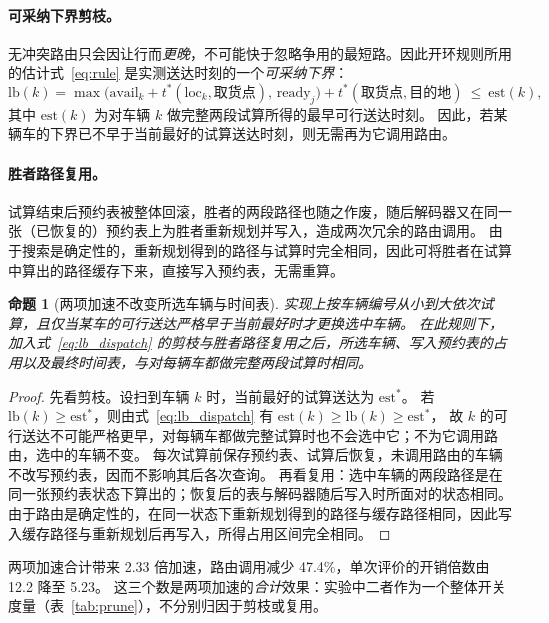 \documentclass[manuscript,screen,review]{acmart}
\newtheorem{prop}{命题}
\newcommand{\SpeedupProbe}{2.33}
\newcommand{\RouteCallCut}{47.4\%}
\newcommand{\CostMultBefore}{12.2}
\newcommand{\CostMultAfter}{5.23}
\begin{document}
\paragraph{可采纳下界剪枝。}
无冲突路由只会因让行而\emph{更晚}，不可能快于忽略争用的最短路。因此开环规则所用的估计式~\eqref{eq:rule} 是实测送达时刻的一个\emph{可采纳下界}：
\begin{equation}
\label{eq:lb_dispatch}
\mathrm{lb}(k)=\max\bigl(\mathrm{avail}_k+t^{*}(\mathrm{loc}_k,\text{取货点}),\,
\mathrm{ready}_j\bigr)+t^{*}(\text{取货点},\text{目的地})\ \le\ \mathrm{est}(k),
\end{equation}
其中 $\mathrm{est}(k)$ 为对车辆 $k$ 做完整两段试算所得的最早可行送达时刻。
因此，若某辆车的下界已不早于当前最好的试算送达时刻，则无需再为它调用路由。

\paragraph{胜者路径复用。}
试算结束后预约表被整体回滚，胜者的两段路径也随之作废，随后解码器又在同一张（已恢复的）预约表上为胜者重新规划并写入，造成两次冗余的路由调用。
由于搜索是确定性的，重新规划得到的路径与试算时完全相同，因此可将胜者在试算中算出的路径缓存下来，直接写入预约表，无需重算。

\begin{prop}[两项加速不改变所选车辆与时间表]
  \label{prop:speedup_equiv}
  实现上按车辆编号从小到大依次试算，且仅当某车的可行送达严格早于当前最好时才更换选中车辆。
  在此规则下，加入式~\eqref{eq:lb_dispatch} 的剪枝与胜者路径复用之后，所选车辆、写入预约表的占用以及最终时间表，与对每辆车都做完整两段试算时相同。
\end{prop}

\begin{proof}
  先看剪枝。设扫到车辆 $k$ 时，当前最好的试算送达为 $\mathrm{est}^{\ast}$。
  若 $\mathrm{lb}(k)\ge \mathrm{est}^{\ast}$，则由式~\eqref{eq:lb_dispatch} 有
  $\mathrm{est}(k)\ge\mathrm{lb}(k)\ge\mathrm{est}^{\ast}$，
  故 $k$ 的可行送达不可能严格更早，对每辆车都做完整试算时也不会选中它；不为它调用路由，选中的车辆不变。
  每次试算前保存预约表、试算后恢复，未调用路由的车辆不改写预约表，因而不影响其后各次查询。
  再看复用：选中车辆的两段路径是在同一张预约表状态下算出的；恢复后的表与解码器随后写入时所面对的状态相同。
  由于路由是确定性的，在同一状态下重新规划得到的路径与缓存路径相同，因此写入缓存路径与重新规划后再写入，所得占用区间完全相同。
\end{proof}

两项加速合计带来 \SpeedupProbe{} 倍加速，路由调用减少 \RouteCallCut{}，单次评价的开销倍数由 \CostMultBefore{} 降至 \CostMultAfter{}。
这三个数是两项加速的\emph{合计}效果：实验中二者作为一个整体开关度量（表~\ref{tab:prune}），不分别归因于剪枝或复用。
\end{document}
